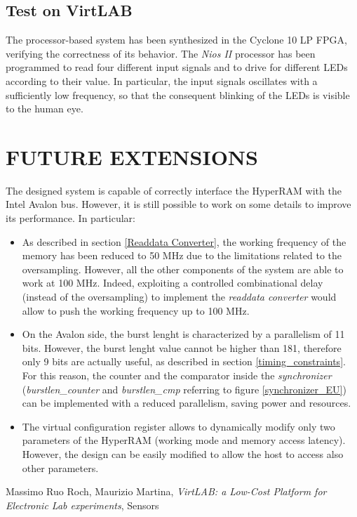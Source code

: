\documentclass[10pt, english, a4paper, titlepage, oneside]{book}
\begin{document}
\section{Test on VirtLAB}
The processor-based system has been synthesized in the Cyclone 10 LP FPGA, verifying the correctness of its behavior. The \textit{Nios II} processor has been programmed to read four different input signals and to drive for different LEDs according to their value. In particular, the input signals oscillates with a sufficiently low frequency, so that the consequent blinking of the LEDs is visible to the human eye.
\chapter{FUTURE EXTENSIONS}
\noindent The designed system is capable of correctly interface the HyperRAM with the Intel Avalon bus. However, it is still possible to work on some details to improve its performance. In particular:
\vspace{2mm}
\begin{itemize}
    \item As described in section \ref{Readdata Converter}, the working frequency of the memory has been reduced to 50 MHz due to the limitations related to the oversampling. However, all the other components of the system are able to work at 100 MHz. Indeed, exploiting a controlled combinational delay (instead of the oversampling) to implement the \textit{readdata converter} would allow to push the working frequency up to 100 MHz.
    \item On the Avalon side, the burst lenght is characterized by a parallelism of 11 bits. However, the burst lenght value cannot be higher than 181, therefore only 9 bits are actually useful, as described in section \ref{timing_constraints}. For this reason, the counter and the comparator inside the \textit{synchronizer} (\textit{burstlen\_counter} and \textit{burstlen\_cmp} referring to figure \ref{synchronizer_EU}) can be implemented with a reduced parallelism, saving power and resources.
    \item The virtual configuration register allows to dynamically modify only two parameters of the HyperRAM (working mode and memory access latency). However, the design can be easily modified to allow the host to access also other parameters.
\end{itemize}


\begin{thebibliography}{1}
     Massimo Ruo Roch, Maurizio Martina, \emph{VirtLAB: a Low-Cost Platform for Electronic Lab experiments}, Sensors
\end{thebibliography}
\end{document}

